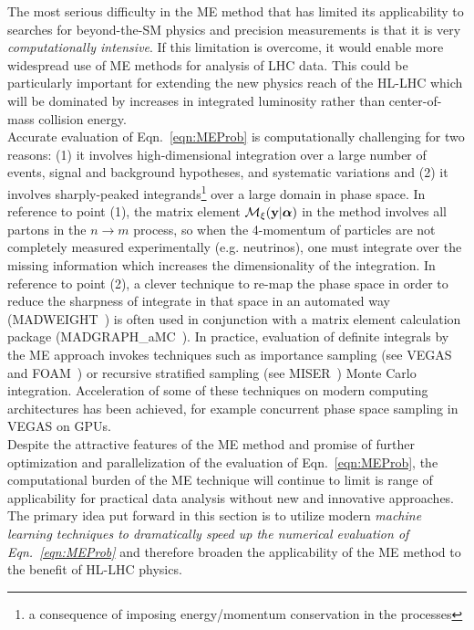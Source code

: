 The most serious difficulty in the ME method that has limited its applicability to searches for beyond-the-SM physics and precision measurements is that it is very \emph{computationally intensive}. If this limitation is overcome, it would enable more widespread use of ME methods for analysis of LHC data. This could be particularly important for extending the new physics reach of the HL-LHC which will be dominated by increases in integrated luminosity rather than center-of-mass collision energy.\\

Accurate evaluation of Eqn.~\ref{eqn:MEProb} is computationally challenging for two reasons: (1) it involves high-dimensional integration over a large number of events, signal and background hypotheses, and systematic variations and (2) it involves sharply-peaked integrands\footnote{a consequence of imposing energy/momentum conservation in the processes} over a large domain in phase space.
In reference to point (1), the matrix element $\mathcal{M}_{\xi}({\bf y}|\boldsymbol\alpha)$ in the method involves all partons in the $n\rightarrow m$ process, so when the 4-momentum of particles are not completely measured experimentally (e.g. neutrinos), one must integrate over the missing information which increases the dimensionality of the integration.
In reference to point (2), a clever technique to re-map the phase space in order to reduce the sharpness of integrate in that space in an automated way ({\sf MADWEIGHT}~\cite{Artoisenet:2010cn}) is often used in conjunction with a matrix element calculation package ({\sf MADGRAPH\_aMC\@NLO}~\cite{Alwall:2014hca}).
In practice, evaluation of definite integrals by the ME approach invokes techniques such as importance sampling (see {\sf VEGAS}~\cite{PETERLEPAGE1978192,Ohl:1998jn} and {\sf FOAM}~\cite{JADACH200355}) or recursive stratified sampling (see MISER~\cite{Press:1989vk}) Monte Carlo integration.
Acceleration of some of these techniques on modern computing architectures has been achieved, for example concurrent phase space sampling in VEGAS on GPUs.\\

Despite the attractive features of the ME method and promise of further optimization and parallelization of the evaluation of Eqn.~\ref{eqn:MEProb}, the computational burden of the ME technique will continue to limit is range of applicability for practical data analysis without new and innovative approaches. The primary idea put forward in this section is to utilize modern \emph{machine learning techniques to dramatically speed up the numerical evaluation of Eqn.~\ref{eqn:MEProb}} and therefore broaden the applicability of the ME method to the benefit of HL-LHC physics.\\

